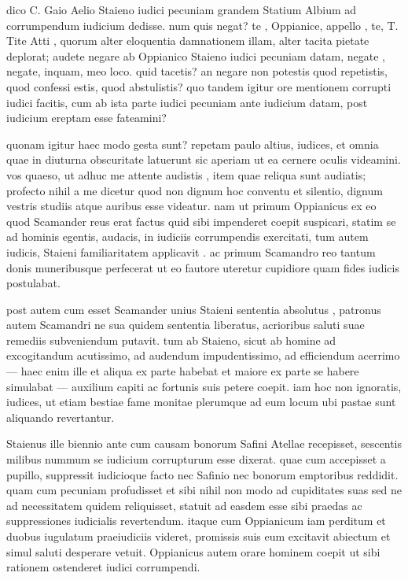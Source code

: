  dico C. Gaio Aelio Staieno iudici pecuniam grandem Statium Albium ad corrumpendum iudicium dedisse. num quis negat? te , Oppianice, appello , te, T. Tite Atti , quorum alter eloquentia damnationem illam, alter tacita pietate deplorat; audete negare ab Oppianico Staieno iudici pecuniam datam, negate , negate, inquam, meo loco. quid tacetis? an negare non potestis quod repetistis, quod confessi estis, quod abstulistis? quo tandem igitur ore mentionem corrupti iudici facitis, cum ab ista parte iudici pecuniam ante iudicium datam, post iudicium ereptam esse fateamini?

 quonam igitur haec modo gesta sunt? repetam paulo altius, iudices, et omnia quae in diuturna obscuritate latuerunt sic aperiam ut ea cernere oculis videamini. vos quaeso, ut adhuc me attente audistis , item quae reliqua sunt audiatis; profecto nihil a me dicetur quod non dignum hoc conventu et silentio, dignum vestris studiis atque auribus esse videatur. nam ut primum Oppianicus ex eo quod Scamander reus erat factus quid sibi impenderet coepit suspicari, statim se ad hominis egentis, audacis, in iudiciis corrumpendis exercitati, tum autem iudicis, Staieni familiaritatem applicavit . ac primum Scamandro reo tantum donis muneribusque perfecerat ut eo fautore uteretur cupidiore quam fides iudicis postulabat.

 post autem cum esset Scamander unius Staieni sententia absolutus , patronus autem Scamandri ne sua quidem sententia liberatus, acrioribus saluti suae remediis subveniendum putavit. tum ab Staieno, sicut ab homine ad excogitandum acutissimo, ad audendum impudentissimo, ad efficiendum acerrimo — haec enim ille et aliqua ex parte habebat et maiore ex parte se habere simulabat — auxilium capiti ac fortunis suis petere coepit. iam hoc non ignoratis, iudices, ut etiam bestiae fame monitae plerumque ad eum locum ubi pastae sunt aliquando revertantur.

 Staienus ille biennio ante cum causam bonorum Safini Atellae recepisset, sescentis milibus nummum se iudicium corrupturum esse dixerat. quae cum accepisset a pupillo, suppressit iudicioque facto nec Safinio nec bonorum emptoribus reddidit. quam cum pecuniam profudisset et sibi nihil non modo ad cupiditates suas sed ne ad necessitatem quidem reliquisset, statuit ad easdem esse sibi praedas ac suppressiones iudicialis revertendum. itaque cum Oppianicum iam perditum et duobus iugulatum praeiudiciis videret, promissis suis eum excitavit abiectum et simul saluti desperare vetuit. Oppianicus autem orare hominem coepit ut sibi rationem ostenderet iudici corrumpendi.


